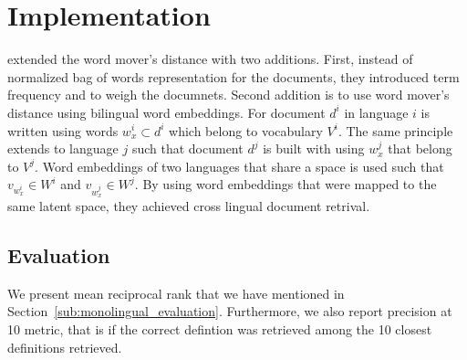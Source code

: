 

\section{\citeauthor{balikas_cross-lingual_2018} Implementation}%
\label{sec:balikas_cross-lingual_2018_implementation}

\textcite{balikas_cross-lingual_2018} extended the word mover's distance with two additions.
First, instead of normalized bag of words representation for the documents, they introduced term frequency and \tfidf{} to weigh the documnets.
Second addition is to use word mover's distance using bilingual word embeddings.
For document $d^{i}$ in language $i$ is written using words $w_{x}^{i} \subset d^{i}$ which belong to vocabulary $V^{i}$.
The same principle extends to language $j$ such that document $d^{j}$ is built with using $w_{x}^{j}$ that belong to $V^{j}$.
Word embeddings of two languages that share a space is used such that $v_{w_{x}^{i}} \in W^{i}$ and $v_{w_{x}^{j}} \in W^{j}$.
By using word embeddings that were mapped to the same latent space, they achieved cross lingual document retrival.

\subsection{Evaluation}%
\label{sub:cldr_evaluation}

We present mean reciprocal rank that we have mentioned in Section~\ref{sub:monolingual_evaluation}.
Furthermore, we also report precision at 10 metric, that is if the correct defintion was retrieved among the 10 closest definitions retrieved.
